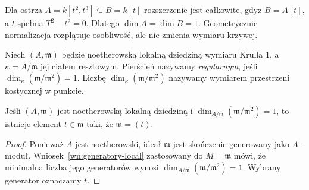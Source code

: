 \begin{przyklad}
Dla ostrza $A=k[t^2,t^3]\subseteq B=k[t]$ rozszerzenie
jest całkowite, gdyż $B=A[t]$, a $t$ spełnia
$T^2-t^2=0$. Dlatego $\dim A=\dim B=1$.
Geometrycznie normalizacja rozplątuje
osobliwość, ale nie zmienia wymiaru krzywej.
\end{przyklad}

\begin{definicja}
Niech $(A,\mathfrak m)$ będzie noetherowską lokalną
dziedziną wymiaru Krulla $1$, a $\kappa=A/\mathfrak m$
jej ciałem resztowym. Pierścień nazywamy
\emph{regularnym}, jeśli
$\dim_\kappa(\mathfrak m/\mathfrak m^2)=1$.
Liczbę $\dim_\kappa(\mathfrak m/\mathfrak m^2)$
nazywamy wymiarem przestrzeni kostycznej w punkcie.
\end{definicja}

\begin{lemat}
\label{lem:param-local}
Jeśli $(A,\mathfrak m)$ jest noetherowską lokalną
dziedziną i $\dim_{A/\mathfrak m}
(\mathfrak m/\mathfrak m^2)=1$, to istnieje
element $t\in\mathfrak m$ taki, że $\mathfrak m=(t)$.
\end{lemat}
\begin{proof}
Ponieważ $A$ jest noetherowski, ideał $\mathfrak m$
jest skończenie generowany jako $A$-moduł.
Wniosek~\ref{wn:generatory-local} zastosowany do
$M=\mathfrak m$ mówi, że minimalna liczba jego
generatorów wynosi
$\dim_{A/\mathfrak m}(\mathfrak m/\mathfrak m^2)=1$.
Wybrany generator oznaczamy $t$.
\end{proof}

